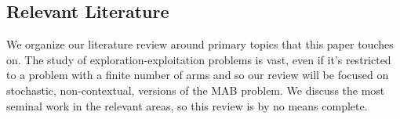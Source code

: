



\subsection{Relevant Literature}
We organize our literature review around primary topics that this paper touches on. The study of exploration-exploitation problems is vast, even if it's restricted to a problem with a finite number of arms and so our review will be focused on stochastic, non-contextual, versions of the MAB problem. We discuss the most seminal work in the relevant areas, so this review is by no means complete.

